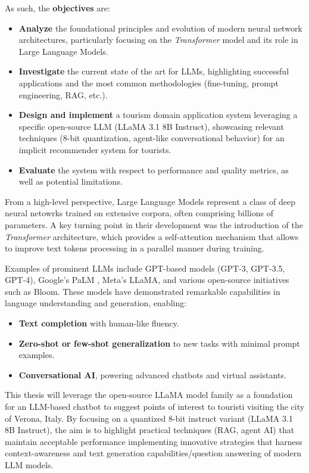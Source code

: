As such, the \textbf{objectives} are:
\begin{itemize}
  \item \textbf{Analyze} the foundational principles and evolution of modern neural network architectures, particularly focusing on the \textit{Transformer} model and its role in Large Language Models.
  \item \textbf{Investigate} the current state of the art for LLMs, highlighting successful applications and the most common methodologies (fine-tuning, prompt engineering, RAG, etc.).
  \item \textbf{Design and implement} a tourism domain application system leveraging a specific open-source LLM (LLaMA 3.1 8B Instruct), showcasing relevant techniques (8-bit quantization, agent-like conversational behavior) for an implicit recommender system for tourists.
  \item \textbf{Evaluate} the system with respect to performance and quality metrics, as well as potential limitations.
\end{itemize}


From a high-level perspective, Large Language Models represent a class of deep neural netowrks trained on extensive corpora, often comprising billions of parameters. A key turning point in their development was the introduction of the \textit{Transformer} architecture, which provides a self-attention mechanism that allows to improve text tokens processing in a parallel manner during training.

Examples of prominent LLMs include GPT-based models (GPT-3, GPT-3.5, GPT-4), \cite{brown2020language} Google’s PaLM \cite{chowdhery2022palm}, Meta’s LLaMA, \cite{touvron2023llama} and various open-source initiatives such as Bloom. \cite{scao2022bloom} These models have demonstrated remarkable capabilities in language understanding and generation, enabling:
\begin{itemize}
    \item \textbf{Text completion} with human-like fluency.
    \item \textbf{Zero-shot or few-shot generalization} to new tasks with minimal prompt examples.
    \item \textbf{Conversational AI}, powering advanced chatbots and virtual assistants.
\end{itemize}

This thesis will leverage the open-source LLaMA model family as a foundation for an LLM-based chatbot to suggest points of interest to touristi visiting the city of Verona, Italy. By focusing on a quantized 8-bit instruct variant (LLaMA 3.1 8B Instruct), the aim is to highlight practical techniques (RAG, agent AI) that maintain acceptable performance implementing innovative strategies that harness context-awareness and text generation capabilities/question answering of modern LLM models.

